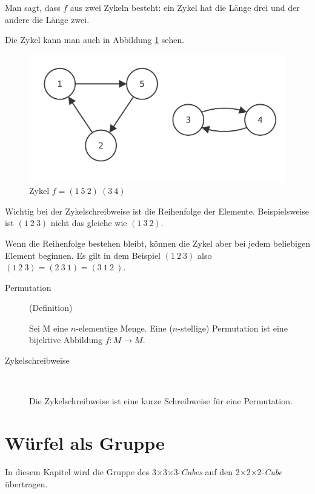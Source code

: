 \documentclass[12pt,a4paper, usenames, dvipsnames]{article}
\newcommand{\Ttwo}{2$\times$2$\times$2-}
\newcommand{\Tthree}{3$\times$3$\times$3-}
\begin{document}
Man sagt, dass $f$ aus zwei Zykeln besteht: ein Zykel hat die Länge drei und der andere die Länge zwei.

Die Zykel kann man auch in Abbildung \ref{10} sehen.
\begin{figure}[h]
\centering
\includegraphics[scale=0.13]{Zykel_152.png}
\caption{Zykel $f = (1 \ 5 \ 2)\ (3 \ 4)$}
\label{10}
\end{figure}


Wichtig bei der Zykelschreibweise ist die Reihenfolge der Elemente. Beispielsweise ist $(1 \ 2 \ 3)$ nicht das gleiche wie $(1 \ 3 \ 2)$. 

Wenn die Reihenfolge bestehen bleibt, können die Zykel aber bei jedem beliebigen Element beginnen. Es gilt in dem Beispiel $(1 \ 2 \ 3)$ also $(1 \ 2 \ 3) = (2 \ 3 \ 1) = (3\ 1 \ 2 \ )$.

{\begin{description}
\item[Permutation] (Definition)

Sei M eine $n$-elementige Menge. Eine ($n$-stellige) Permutation ist eine bijektive Abbildung $f: M \rightarrow M$.

\item[Zykelschreibweise] \ 

Die Zykelschreibweise ist eine kurze Schreibweise für eine Permutation.

\end{description}}
%
%
%
%
%
%
%
%
%
%
%
%
%
\newpage
\section{Würfel als Gruppe}

In diesem Kapitel wird die Gruppe des \Tthree \textit{Cubes} auf den \Ttwo \textit{Cube} übertragen. 
\end{document}
